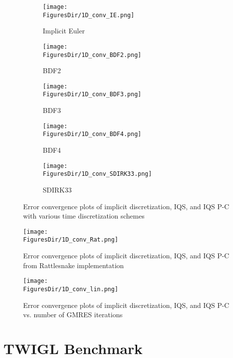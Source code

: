 \begin{figure}[!htbp]
\centering
\begin{subfigure}[b]{0.49\textwidth}
\centering
\texttt{[image: \\FiguresDir/1D\_conv\_IE.png]}
\caption{Implicit Euler}
\end{subfigure}
\begin{subfigure}[b]{0.49\textwidth}
\centering
\texttt{[image: \\FiguresDir/1D\_conv\_BDF2.png]}
\caption{BDF2}
\end{subfigure}
\begin{subfigure}[b]{0.49\textwidth}
\centering
\texttt{[image: \\FiguresDir/1D\_conv\_BDF3.png]}
\caption{BDF3}
\end{subfigure}
\begin{subfigure}[b]{0.49\textwidth}
\centering
\texttt{[image: \\FiguresDir/1D\_conv\_BDF4.png]}
\caption{BDF4}
\end{subfigure}
\begin{subfigure}[b]{0.49\textwidth}
\centering
\texttt{[image: \\FiguresDir/1D\_conv\_SDIRK33.png]}
\caption{SDIRK33}
\end{subfigure}
\caption{Error convergence plots of implicit discretization, IQS, and IQS P-C with various time discretization schemes}
\label{fig:1D_conv}
\end{figure}

\begin{figure}[!htbp]
\begin{center}
\texttt{[image: \\FiguresDir/1D\_conv\_Rat.png]}
\caption{Error convergence plots of implicit discretization, IQS, and IQS P-C from Rattlesnake implementation}
\label{fig:1D_conv_Rat}
\end{center}
\end{figure}

\begin{figure}[!htbp]
\begin{center}
\texttt{[image: \\FiguresDir/1D\_conv\_lin.png]}
\caption{Error convergence plots of implicit discretization, IQS, and IQS P-C vs. number of GMRES iterations}
\label{fig:1D_conv_lin}
\end{center}
\end{figure}

\pagebreak
\section{TWIGL Benchmark}

